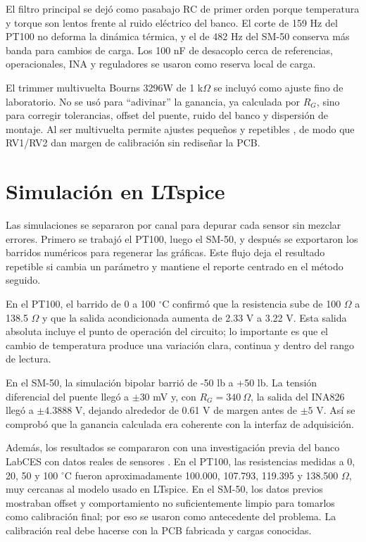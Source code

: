 \documentclass[conference]{IEEEtran}
\begin{document}
El filtro principal se dejó como pasabajo RC de primer orden porque temperatura y torque son lentos frente al ruido eléctrico del banco. El corte de 159 Hz del PT100 no deforma la dinámica térmica, y el de 482 Hz del SM-50 conserva más banda para cambios de carga. Los 100 nF de desacoplo cerca de referencias, operacionales, INA y reguladores se usaron como reserva local de carga.

El trimmer multivuelta Bourns 3296W de 1 k$\Omega$ se incluyó como ajuste fino de laboratorio. No se usó para ``adivinar'' la ganancia, ya calculada por $R_G$, sino para corregir tolerancias, offset del puente, ruido del banco y dispersión de montaje. Al ser multivuelta permite ajustes pequeños y repetibles \cite{bourns3296}, de modo que RV1/RV2 dan margen de calibración sin rediseñar la PCB.

\section{Simulación en LTspice}

Las simulaciones se separaron por canal para depurar cada sensor sin mezclar errores. Primero se trabajó el PT100, luego el SM-50, y después se exportaron los barridos numéricos para regenerar las gráficas. Este flujo deja el resultado repetible si cambia un parámetro y mantiene el reporte centrado en el método seguido.

En el PT100, el barrido de 0 a 100 $^\circ$C confirmó que la resistencia sube de 100 $\Omega$ a 138.5 $\Omega$ y que la salida acondicionada aumenta de 2.33 V a 3.22 V. Esta salida absoluta incluye el punto de operación del circuito; lo importante es que el cambio de temperatura produce una variación clara, continua y dentro del rango de lectura.

En el SM-50, la simulación bipolar barrió de -50 lb a +50 lb. La tensión diferencial del puente llegó a $\pm30$ mV y, con $R_G=340~\Omega$, la salida del INA826 llegó a $\pm4.3888$ V, dejando alrededor de 0.61 V de margen antes de $\pm5$ V. Así se comprobó que la ganancia calculada era coherente con la interfaz de adquisición.

Además, los resultados se compararon con una investigación previa del banco LabCES con datos reales de sensores \cite{labces_prev}. En el PT100, las resistencias medidas a 0, 20, 50 y 100 $^\circ$C fueron aproximadamente 100.000, 107.793, 119.395 y 138.500 $\Omega$, muy cercanas al modelo usado en LTspice. En el SM-50, los datos previos mostraban offset y comportamiento no suficientemente limpio para tomarlos como calibración final; por eso se usaron como antecedente del problema. La calibración real debe hacerse con la PCB fabricada y cargas conocidas.
\end{document}
